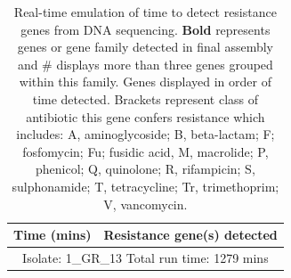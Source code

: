 \begin{table}[!hpt]
\centering
\scriptsize
\caption[Real-time emulation of time to detect resistance genes from DNA sequencing]{Real-time emulation of time to detect resistance genes from DNA sequencing. \textbf{Bold} represents genes or gene family detected in final assembly and \# displays more than three genes grouped within this family. Genes displayed in order of time detected. Brackets represent class of antibiotic this gene confers resistance which includes: A, aminoglycoside; B, beta-lactam; F; fosfomycin; Fu; fusidic acid, M, macrolide; P, phenicol; Q, quinolone; R, rifampicin; S, sulphonamide; T, tetracycline; Tr, trimethoprim; V, vancomycin.}
\label{supp_tab:emulate}
\begin{tabular}{|l|c|}
\hline
{\small Time (mins)} & {\small Resistance gene(s) detected}  \\ \hline \hline
\multicolumn{2}{|c|}{\small Isolate: 1\_GR\_13 Total run time: 1279 mins} \\ \hline \hline


\end{tabular}
\end{table}
